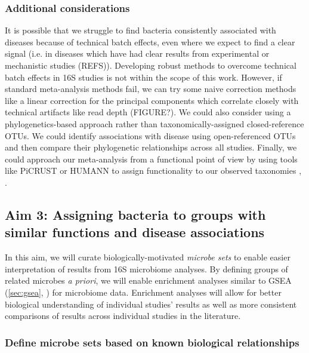 \documentclass[12pt]{article}
\begin{document}
\subsubsection{Additional considerations}
It is possible that we struggle to find bacteria consistently 
associated with diseases because of technical batch effects, even 
where we expect to find a clear signal (i.e. in diseases which have 
had clear results from experimental or mechanistic studies (REFS)). 
Developing robust methods to overcome technical batch effects in 16S 
studies is not within the scope of this work. However, if standard 
meta-analysis methods fail, we can try some naive correction methods 
like a linear correction for the principal components which correlate 
closely with technical artifacts like read depth (FIGURE?). We could 
also consider using a phylogenetics-based approach rather than 
taxonomically-assigned closed-reference OTUs. We could identify 
associations with disease using open-referenced OTUs and then compare 
their phylogenetic relationships across all studies. Finally, we could 
approach our meta-analysis from a functional point of view by
using tools like PiCRUST or HUMANN to assign functionality to our
observed taxonomies \cite{langille-picrust-2013}, \cite{abubucker-humann-2012}.

\subsection{Aim 3: Assigning bacteria to groups with similar functions and disease associations}

In this aim, we will curate biologically-motivated \textit{microbe 
sets} to enable easier interpretation of results from 16S microbiome 
analyses. By defining groups of related microbes \textit{a priori}, we 
will enable enrichment analyses similar to GSEA (\ref{sec:gsea}, 
\cite{subramanian-gsea-2005}) for microbiome data. Enrichment analyses will allow for better 
biological understanding of individual studies' results as well as 
more consistent comparisons of results across individual studies in 
the literature.

\subsubsection{Define microbe sets based on known biological relationships}
\end{document}
